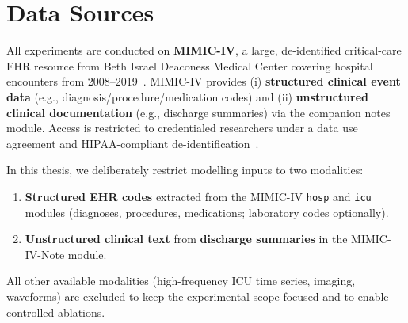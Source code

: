 


\section{Data Sources}
\label{sec:data-sources}

All experiments are conducted on \textbf{MIMIC-IV}, a large, de-identified critical-care EHR resource from Beth Israel Deaconess Medical Center covering hospital encounters from 2008--2019~\cite{johnson2023mimiciv}. MIMIC-IV provides (i) \textbf{structured clinical event data} (e.g., diagnosis/procedure/medication codes) and (ii) \textbf{unstructured clinical documentation} (e.g., discharge summaries) via the companion notes module. Access is restricted to credentialed researchers under a data use agreement and HIPAA-compliant de-identification~\cite{johnson2023mimiciv}.

In this thesis, we deliberately restrict modelling inputs to two modalities:
\begin{enumerate}
    \item \textbf{Structured EHR codes} extracted from the MIMIC-IV \texttt{hosp} and \texttt{icu} modules (diagnoses, procedures, medications; laboratory codes optionally).
    \item \textbf{Unstructured clinical text} from \textbf{discharge summaries} in the MIMIC-IV-Note module.
\end{enumerate}
All other available modalities (high-frequency ICU time series, imaging, waveforms) are excluded to keep the experimental scope focused and to enable controlled ablations.

